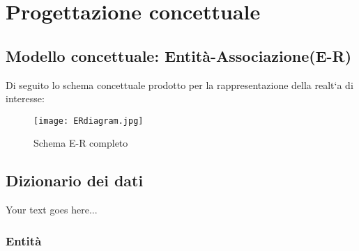 \documentclass[a4paper,12pt,italian,towside]{article}
\begin{document}
\newpage

\section{Progettazione concettuale}

\subsection{Modello concettuale: Entit\`a-Associazione(E-R)}
Di seguito lo schema concettuale prodotto per la rappresentazione della realt`a di interesse:

\begin{figure}[!h] %
	\caption{Schema E-R completo}
	\begin{center}
		\texttt{[image: ERdiagram.jpg]}
	\end{center}
\end{figure}

\subsection{Dizionario dei dati}

Your text goes here...

\subsubsection{Entit\`a}
\end{document}

